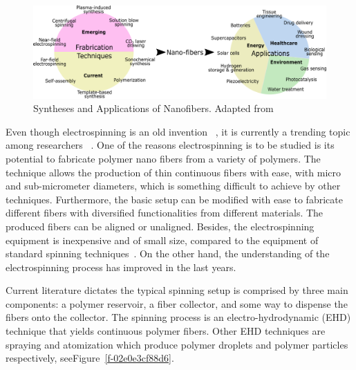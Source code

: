 \begin{figure}[!th]
\centering
\includegraphics[width=\textwidth]{./Figures/synthesesAndApplicationsOfNanofibers.png}
\decoRule
\caption[Syntheses and Applications of Nanofibers]{Syntheses and Applications of Nanofibers. Adapted from \cite{Kenry2017}}
\label{fig:synthesesAndApplicationsOfNanofibers}
\end{figure}

Even though electrospinning is an old invention \unskip~\cite{527120:12073288}, it is currently a trending topic among researchers \unskip~\cite{527120:12073453,527120:12073495,527120:12073496}. One of the reasons electrospinning is to be studied is its potential to fabricate polymer nano fibers from a variety of polymers. The technique allows the production of thin continuous fibers with ease, with micro and sub-micrometer diameters, which is something difficult to achieve by other techniques. Furthermore, the basic setup can be modified with ease to fabricate different fibers with diversified functionalities from different materials. The produced fibers can be aligned or unaligned. Besides, the electrospinning equipment is inexpensive and of small size, compared to the equipment of standard spinning techniques\unskip~\cite{527120:12073538}. On the other hand, the understanding of the electrospinning process has improved in the last years.

Current literature dictates the typical spinning setup is comprised by three main components: a polymer reservoir, a fiber collector, and some way to dispense the fibers onto the collector. The spinning process is an electro-hydrodynamic (EHD) technique that yields continuous polymer fibers. Other EHD techniques are spraying and atomization which produce polymer droplets and polymer particles respectively, seeFigure~\ref{f-02e0e3cf88d6}.

